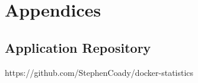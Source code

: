 \appendix
\section*{Appendices}
\renewcommand{\thesubsection}{\Alph{subsection}}

\subsection{Application Repository}
\label{appendix:ansible-repo}
https://github.com/StephenCoady/docker-statistics
